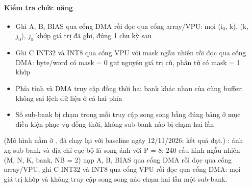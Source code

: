\documentclass[10pt,a4paper]{article}
\begin{document}
\paragraph{Kiểm tra chức năng}
\begin{itemize}
\item Ghi A, B, BIAS qua cổng DMA rồi đọc qua cổng array/VPU: mọi (i$_0$, k), (k, $j_0$), $j_0$ khớp giá trị đã ghi, đúng 1 chu kỳ sau 
\item Ghi C INT32 và INT8 qua cổng VPU với mask ngẫu nhiên rồi đọc qua cổng DMA: byte/word có mask = 0 giữ nguyên giá trị cũ, phần tử có mask = 1 khớp
\item Phía tính và DMA truy cập đồng thời hai bank khác nhau của cùng buffer: không sai lệch dữ liệu ở cả hai phía
\item Số sub-bank bị chạm trong mỗi truy cập song song bằng đúng bảng ở mục điều kiện phục vụ đồng thời, không sub-bank nào bị chạm hai lần
\end{itemize}

\begin{notebox}
(Mô hình nằm ở , đã chạy lại với baseline ngày 12/11/2026; kết quả đạt.) : ánh xạ sub-bank và địa chỉ cục bộ là song ánh với P = 8; 240 cấu hình ngẫu nhiên (M, N, K, bank, NB = 2) nạp A, B, BIAS qua cổng DMA rồi đọc qua cổng array/VPU, ghi C INT32 và INT8 qua cổng VPU rồi đọc qua cổng DMA: mọi giá trị khớp và không truy cập song song nào chạm hai lần một sub-bank.
\end{notebox}
\end{document}
